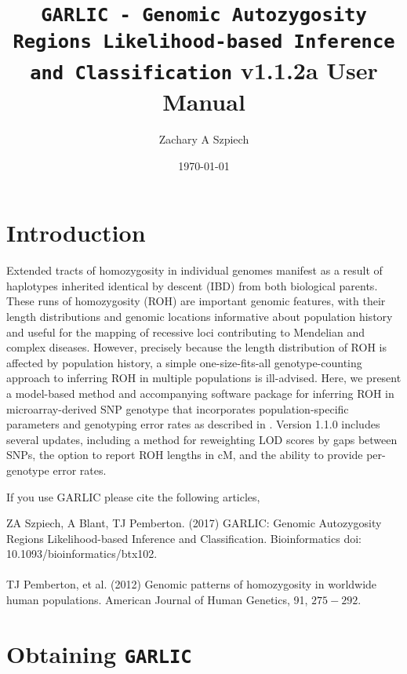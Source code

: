\documentclass[12pt]{article}%
\title{{\tt GARLIC - Genomic Autozygosity Regions Likelihood-based Inference and Classification} v1.1.2a User Manual}
\date{\today}
\author{Zachary A Szpiech}
\begin{document}
\lstset{breaklines=true,basicstyle=\ttfamily}

\null  %
\nointerlineskip  %
\vfill
\let\snewpage \newpage
\let\newpage \relax
\maketitle
\thispagestyle{empty}
\let \newpage \snewpage
\vfill 
\break %

\tableofcontents 

\newpage

\section{Introduction}

Extended tracts of homozygosity in individual genomes manifest as a result of haplotypes inherited identical by descent (IBD) from both biological parents. These runs of homozygosity (ROH) are important genomic features, with their length distributions and genomic locations informative about population history and useful for the mapping of recessive loci contributing to Mendelian and complex diseases. However, precisely because the length distribution of ROH is affected by population history, a simple one-size-fits-all genotype-counting approach to inferring ROH in multiple populations is ill-advised. Here, we present a model-based method and accompanying software package for inferring ROH in microarray-derived SNP genotype that incorporates population-specific parameters and genotyping error rates as described in \cite{PembertonEtAl12:AJHG}. Version 1.1.0 includes several updates, including a method for reweighting LOD scores by gaps between SNPs, the option to report ROH lengths in cM, and the ability to provide per-genotype error rates.

If you use GARLIC please cite the following articles,

\noindent ZA Szpiech, A Blant, TJ Pemberton. (2017) GARLIC: Genomic Autozygosity Regions Likelihood-based Inference and Classification. Bioinformatics doi: 10.1093/bioinformatics/btx102.
\\\\
TJ Pemberton, et al. (2012) Genomic patterns of homozygosity in worldwide human populations. American Journal of Human Genetics, 91, $275-292$.

\section{Obtaining {\tt GARLIC}}
\end{document}
